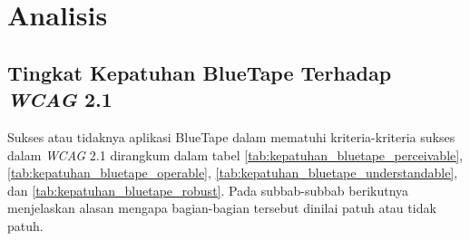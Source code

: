 \chapter{Analisis}
\label{chap:analisis}

\section{Tingkat Kepatuhan BlueTape Terhadap \textit{WCAG} 2.1}
\label{sec:kepatuhan_bluetape_terhadap_wcag_2.1}
Sukses atau tidaknya aplikasi BlueTape dalam mematuhi kriteria-kriteria sukses dalam \textit{WCAG} 2.1 dirangkum dalam tabel \ref{tab:kepatuhan_bluetape_perceivable}, \ref{tab:kepatuhan_bluetape_operable}, \ref{tab:kepatuhan_bluetape_understandable}, dan \ref{tab:kepatuhan_bluetape_robust}. Pada subbab-subbab berikutnya menjelaskan alasan mengapa bagian-bagian tersebut dinilai patuh atau tidak patuh.
